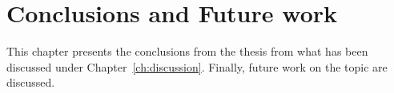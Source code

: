 \chapter{Conclusions and Future work}
\label{ch:conclusionsAndFutureWork}
This chapter presents the conclusions from the thesis from what has been discussed under Chapter~\ref{ch:discussion}. Finally, future work on the topic are discussed.



% 

% 



% 
